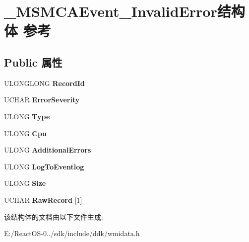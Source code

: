 \hypertarget{struct___m_s_m_c_a_event___invalid_error}{}\section{\+\_\+\+M\+S\+M\+C\+A\+Event\+\_\+\+Invalid\+Error结构体 参考}
\label{struct___m_s_m_c_a_event___invalid_error}
\subsection*{Public 属性}
\begin{DoxyCompactItemize}
\item 
\mbox{\label{struct___m_s_m_c_a_event___invalid_error_ac5ab914003d6adefcc307d9736459044}} 
U\+L\+O\+N\+G\+L\+O\+NG {\bfseries Record\+Id}
\item 
\mbox{\label{struct___m_s_m_c_a_event___invalid_error_abab5d73d6d733f6c27c490f443c0016f}} 
U\+C\+H\+AR {\bfseries Error\+Severity}
\item 
\mbox{\label{struct___m_s_m_c_a_event___invalid_error_a5f89d3d706bd8c0dd589de53a8a3964f}} 
U\+L\+O\+NG {\bfseries Type}
\item 
\mbox{\label{struct___m_s_m_c_a_event___invalid_error_ae635b9bd1c7b530730f869af9bbcc8aa}} 
U\+L\+O\+NG {\bfseries Cpu}
\item 
\mbox{\label{struct___m_s_m_c_a_event___invalid_error_ae11f86bd9a6bbeb65039653e67f843f7}} 
U\+L\+O\+NG {\bfseries Additional\+Errors}
\item 
\mbox{\label{struct___m_s_m_c_a_event___invalid_error_a2cd6fd520b24f232a99de8b5847fae90}} 
U\+L\+O\+NG {\bfseries Log\+To\+Eventlog}
\item 
\mbox{\label{struct___m_s_m_c_a_event___invalid_error_a35b473a732ee5cfa4c33877fa568070a}} 
U\+L\+O\+NG {\bfseries Size}
\item 
\mbox{\label{struct___m_s_m_c_a_event___invalid_error_a92f57ac14777d5d6c89df867bd50e60a}} 
U\+C\+H\+AR {\bfseries Raw\+Record} \mbox{[}1\mbox{]}
\end{DoxyCompactItemize}


该结构体的文档由以下文件生成\+:\begin{DoxyCompactItemize}
\item 
E\+:/\+React\+O\+S-\/0../sdk/include/ddk/wmidata.\+h\end{DoxyCompactItemize}

